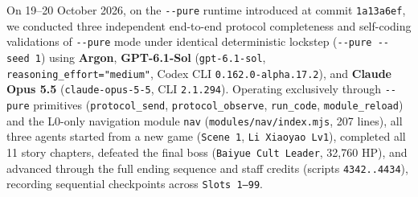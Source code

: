 \documentclass[11pt,a4paper]{article}
\begin{document}
On 19--20 October 2026, on the \texttt{-\allowbreak{}-\allowbreak{}pure} runtime introduced at commit \texttt{1a13a6ef}, we conducted three independent end-to-end protocol completeness and self-coding validations of \texttt{-\allowbreak{}-\allowbreak{}pure} mode under identical deterministic lockstep (\texttt{-\allowbreak{}-\allowbreak{}pure\allowbreak{} \allowbreak{}-\allowbreak{}-\allowbreak{}seed\allowbreak{} \allowbreak{}1}) using \textbf{Argon}, \textbf{GPT-6.1-Sol} (\texttt{gpt\allowbreak{}-\allowbreak{}6\allowbreak{}.\allowbreak{}1\allowbreak{}-\allowbreak{}sol}, \texttt{reasoning\allowbreak{}\_\allowbreak{}effort\allowbreak{}=\allowbreak{}"medium"}, Codex CLI \texttt{0\allowbreak{}.\allowbreak{}162\allowbreak{}.\allowbreak{}0\allowbreak{}-\allowbreak{}alpha\allowbreak{}.\allowbreak{}17\allowbreak{}.\allowbreak{}2}), and \textbf{Claude Opus 5.5} (\texttt{claude\allowbreak{}-\allowbreak{}opus\allowbreak{}-\allowbreak{}5\allowbreak{}-\allowbreak{}5}, CLI \texttt{2\allowbreak{}.\allowbreak{}1\allowbreak{}.\allowbreak{}294}). Operating exclusively through \texttt{-\allowbreak{}-\allowbreak{}pure} primitives (\texttt{protocol\allowbreak{}\_\allowbreak{}send}, \texttt{protocol\allowbreak{}\_\allowbreak{}observe}, \texttt{run\allowbreak{}\_\allowbreak{}code}, \texttt{module\allowbreak{}\_\allowbreak{}reload}) and the L0-only navigation module \texttt{nav} (\texttt{modules\allowbreak{}/\allowbreak{}nav\allowbreak{}/\allowbreak{}index\allowbreak{}.\allowbreak{}mjs}, 207 lines), all three agents started from a new game (\texttt{Scene\allowbreak{} \allowbreak{}1}, \texttt{Li\allowbreak{} \allowbreak{}Xiaoyao\allowbreak{} \allowbreak{}Lv1}), completed all 11 story chapters, defeated the final boss (\texttt{Baiyue\allowbreak{} \allowbreak{}Cult\allowbreak{} \allowbreak{}Leader}, 32,760 HP), and advanced through the full ending sequence and staff credits (scripts \texttt{4342\allowbreak{}.\allowbreak{}.\allowbreak{}4434}), recording sequential checkpoints across \texttt{Slots\allowbreak{} \allowbreak{}1--99}.
\end{document}
